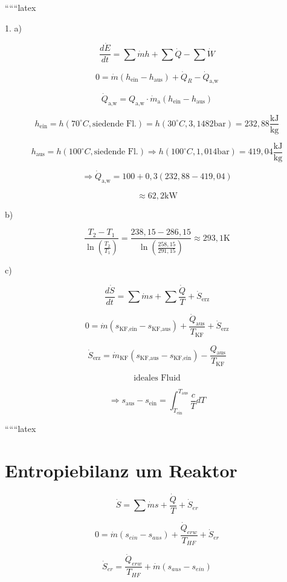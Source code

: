 
``````latex

1. a)

\[
\frac{d\dot{E}}{dt} = \sum \dot{m} h + \sum \dot{Q} - \sum \dot{W}
\]

\[
0 = \dot{m} (h_{\text{ein}} - h_{\text{aus}}) + \dot{Q}_R - \dot{Q}_{\text{a,w}}
\]

\[
\dot{Q}_{\text{a,w}} = Q_{\text{a,w}} \cdot \dot{m}_{\text{a}} (h_{\text{ein}} - h_{\text{aus}})
\]

\[
h_{\text{ein}} = h(70^\circ C, \text{siedende Fl.}) = h(30^\circ C, 3,1482 \text{bar}) = 232,88 \frac{\text{kJ}}{\text{kg}}
\]

\[
h_{\text{aus}} = h(100^\circ C, \text{siedende Fl.}) \Rightarrow h(100^\circ C, 1,014 \text{bar}) = 419,04 \frac{\text{kJ}}{\text{kg}}
\]

\[
\Rightarrow \dot{Q}_{\text{a,w}} = 100 + 0,3 (232,88 - 419,04)
\]

\[
\approx 62,2 \text{kW}
\]

b)

\[
\frac{T_2 - T_1}{\ln \left( \frac{T_2}{T_1} \right)} = \frac{238,15 - 286,15}{\ln \left( \frac{258,15}{291,15} \right)} \approx 293,1 \text{K}
\]

c)

\[
\frac{d\dot{S}}{dt} = \sum \dot{m} s + \sum \frac{\dot{Q}}{T} + \dot{S}_{\text{erz}}
\]

\[
0 = \dot{m} (s_{\text{KF,ein}} - s_{\text{KF,aus}}) + \frac{\dot{Q}_{\text{aus}}}{T_{\text{KF}}} + \dot{S}_{\text{erz}}
\]

\[
\dot{S}_{\text{erz}} = \dot{m}_{\text{KF}} (s_{\text{KF,aus}} - s_{\text{KF,ein}}) - \frac{Q_{\text{aus}}}{T_{\text{KF}}}
\]

\[
\text{ideales Fluid}
\]

\[
\Rightarrow s_{\text{aus}} - s_{\text{ein}} = \int_{T_{\text{ein}}}^{T_{\text{aus}}} \frac{c}{T} dT
\]

``````latex


\section*{Entropiebilanz um Reaktor}

\[
\dot{S} = \sum \dot{m} s + \frac{\dot{Q}}{T} + \dot{S}_{er}
\]

\[
0 = \dot{m} (s_{ein} - s_{aus}) + \frac{\dot{Q}_{erw}}{T_{HF}} + \dot{S}_{er}
\]

\[
\dot{S}_{er} = \frac{\dot{Q}_{erw}}{T_{HF}} + \dot{m} (s_{aus} - s_{ein})
\]

